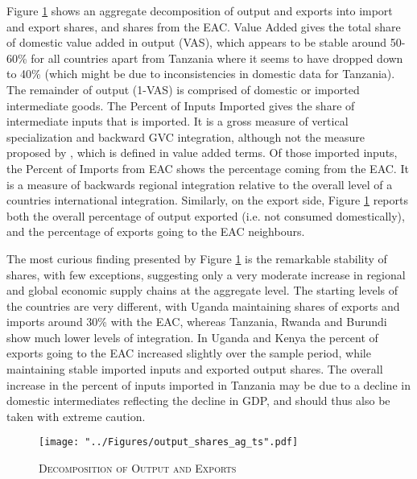 \documentclass[a4paper]{article}
\begin{document}
Figure \ref{fig:outshares_ag_ts} shows an aggregate decomposition of output and exports into import and export shares, and shares from the EAC. Value Added gives the total share of domestic value added in output (VAS), which appears to be stable around 50-60\% for all countries apart from Tanzania where it seems to have dropped down to 40\% (which might be due to inconsistencies in domestic data for Tanzania). The remainder of output (1-VAS) is comprised of domestic or imported intermediate goods. The Percent of Inputs Imported gives the share of intermediate inputs that is imported. It is a gross measure of vertical specialization and backward GVC integration, although not the measure proposed by \citet{hummels2001nature}, which is defined in value added terms. Of those imported inputs, the Percent of Imports from EAC shows the percentage coming from the EAC. It is a measure of backwards regional integration relative to the overall level of a countries international integration.  Similarly, on the export side, Figure \ref{fig:outshares_ag_ts} reports both the overall percentage of output exported (i.e. not consumed domestically), and the percentage of exports going to the EAC neighbours. \newline

The most curious finding presented by Figure \ref{fig:outshares_ag_ts} is the remarkable stability of shares, with few exceptions, suggesting only a very moderate increase in regional and global economic supply chains at the aggregate level. The starting levels of the countries are very different, with Uganda maintaining shares of exports and imports around 30\% with the EAC, whereas Tanzania, Rwanda and Burundi show much lower levels of integration. In Uganda and Kenya the percent of exports going to the EAC increased slightly over the sample period, while maintaining stable imported inputs and exported output shares. The overall increase in the percent of inputs imported in Tanzania may be due to a decline in domestic intermediates reflecting the decline in GDP, and should thus also be taken with extreme caution.  


\begin{figure}[h!]
\centering
\caption{\label{fig:outshares_ag_ts}\textsc{Decomposition of Output and Exports}}
\texttt{[image: "../Figures/output\_shares\_ag\_ts".pdf]} %
\end{figure}
\FloatBarrier
\end{document}
